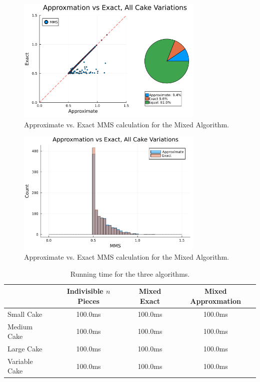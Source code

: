 \begin{figure}
    \centering
    \includegraphics[width=0.8\textwidth]{assets/plots/scatter_approximate_vs_exact.png}
    \caption{Approximate vs. Exact MMS calculation for the Mixed Algorithm.}
    \label{fig:scatter_approximate_vs_exact}
\end{figure}
\begin{figure}
    \centering
    \includegraphics[width=0.8\textwidth]{assets/plots/histogram_approximate_vs_exact.png}
    \caption{Approximate vs. Exact MMS calculation for the Mixed Algorithm.}
    \label{fig:histogram_approximate_vs_exact}
\end{figure}


\begin{table}[h]
    \centering
    \caption{Running time for the three algorithms.}
    \label{tab:running_time}
    \begin{tabular}{|l|ccc|}
        \hline
                      & Indivisible $n$ Pieces & Mixed Exact & Mixed Approxmation \\
        \hline
        Small Cake    & 100.0ms                & 100.0ms     & 100.0ms            \\
        Medium Cake   & 100.0ms                & 100.0ms     & 100.0ms            \\
        Large Cake    & 100.0ms                & 100.0ms     & 100.0ms            \\
        Variable Cake & 100.0ms                & 100.0ms     & 100.0ms            \\
        \hline
    \end{tabular}
\end{table}


\clearpage

